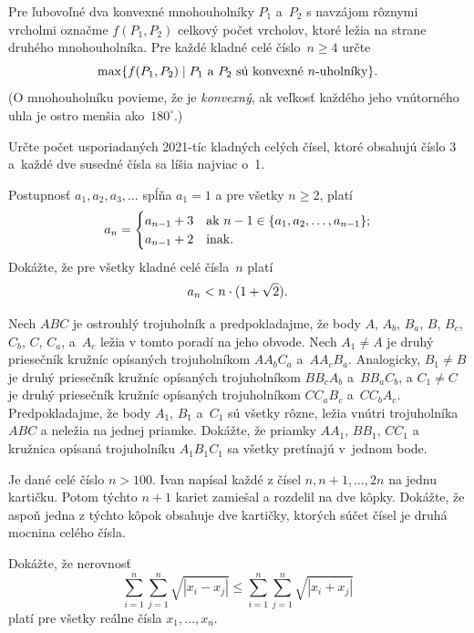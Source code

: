 {%
Pre ľubovoľné dva konvexné mnohouholníky $P_1$ a~$P_2$ s navzájom rôznymi vrcholmi označme $f(P_1, P_2)$ celkový počet vrcholov, ktoré ležia na strane druhého mnohouholníka. Pre každé kladné celé číslo~$n \ge 4$ určte
$$
\max\{ f(P_1, P_2) \mid
       \hbox{$P_1$ a $P_2$ sú konvexné $n$-uholníky}
    \}.
$$
(O mnohouholníku povieme, že je {\it konvexný}, ak veľkosť každého jeho vnútorného uhla je ostro menšia ako~$180^\circ$.)
}

{%
Určte počet usporiadaných 2021-tíc kladných celých čísel, ktoré obsahujú číslo $3$ a~každé dve susedné čísla sa líšia najviac o~1.
}

{%
Postupnosť $a_1, a_2, a_3, \dots$ spĺňa $a_1 = 1$ a pre všetky $n \ge 2$, platí
$$
a_n = \begin{cases}
			a_{n-1} + 3 &
			    \text{ak } n-1 \in \{a_1, a_2,\ldots ,a_{n-1}\};\cr
			a_{n-1} + 2 &
			    \text{inak.}
	  \end{cases}
$$
Dokážte, že pre všetky kladné celé čísla~$n$ platí
$$
a_n < n\cdot(1 + \sqrt2).
\belowdisplayskip0pt
$$
}

{%
Nech $ABC$ je ostrouhlý trojuholník a predpokladajme, že body $A$, $A_b$, $B_a$, $B$, $B_c$, $C_b$, $C$, $C_a$, a~$A_c$ ležia v tomto poradí na jeho obvode. Nech $A_1\ne A$ je druhý priesečník kružníc opísaných trojuholníkom $AA_bC_a$ a~$AA_cB_a$. Analogicky, $B_1\ne B$ je druhý priesečník kružníc opísaných trojuholníkom $BB_cA_b$ a~$BB_aC_b$, a $C_1\ne C$ je druhý priesečník kružníc opísaných trojuholníkom $CC_aB_c$ a~$CC_bA_c$.
Predpokladajme, že body $A_1$, $B_1$ a~$C_1$ sú všetky rôzne, ležia vnútri trojuholníka $ABC$ a neležia na jednej priamke.
Dokážte, že priamky $AA_1$, $BB_1$, $CC_1$ a kružnica opísaná trojuholníku $A_1B_1C_1$ sa všetky pretínajú v~jednom bode.
}

{%
Je dané celé číslo $n>100$. Ivan napísal každé z čísel $n,n+1,\ldots,2n$ na jednu kartičku.
Potom týchto $n+ 1$ kariet zamiešal a rozdelil na dve kôpky. Dokážte, že aspoň jedna z týchto kôpok
obsahuje dve kartičky, ktorých súčet čísel je druhá mocnina celého čísla.}

{%
Dokážte, že nerovnosť
$$
\sum_{i=1}^n \sum_{j=1}^n \sqrt{|x_i-x_j|} \leq
\sum_{i=1}^n \sum_{j=1}^n \sqrt{|x_i+x_j|}
$$
platí pre všetky reálne čísla $x_1,\ldots,x_n$.}

